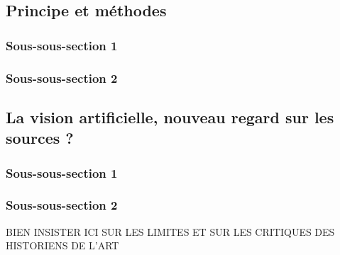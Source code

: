 
\subsection{Principe et méthodes}
    \subsubsection{Sous-sous-section 1}

    
    \subsubsection{Sous-sous-section 2}


    \subsection{La vision artificielle, nouveau regard sur les sources ?}
        \subsubsection{Sous-sous-section 1}


        \subsubsection{Sous-sous-section 2}
        
        BIEN INSISTER ICI SUR LES LIMITES ET SUR LES CRITIQUES DES HISTORIENS DE L'ART

